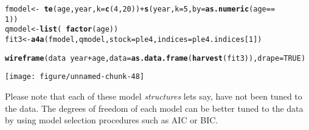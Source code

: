 \documentclass[a4paper,english,10pt]{article}\usepackage[]{graphicx}\usepackage[]{color}
\makeatletter
\def\maxwidth{ %
  \ifdim\Gin@nat@width>\linewidth
    \linewidth
  \else
    \Gin@nat@width
  \fi
}
\newcommand{\hlnum}[1]{\textcolor[rgb]{0.686,0.059,0.569}{#1}}%
\newcommand{\hlopt}[1]{\textcolor[rgb]{0,0,0}{#1}}%
\newcommand{\hlstd}[1]{\textcolor[rgb]{0.345,0.345,0.345}{#1}}%
\newcommand{\hlkwb}[1]{\textcolor[rgb]{0.69,0.353,0.396}{#1}}%
\newcommand{\hlkwc}[1]{\textcolor[rgb]{0.333,0.667,0.333}{#1}}%
\newcommand{\hlkwd}[1]{\textcolor[rgb]{0.737,0.353,0.396}{\textbf{#1}}}%
\newenvironment{kframe}{%
 \def\at@end@of@kframe{}%
 \ifinner\ifhmode%
  \def\at@end@of@kframe{\end{minipage}}%
  \begin{minipage}{\columnwidth}%
 \fi\fi%
 \def\FrameCommand##1{\hskip\@totalleftmargin \hskip-\fboxsep
 \colorbox{shadecolor}{##1}\hskip-\fboxsep
     \hskip-\linewidth \hskip-\@totalleftmargin \hskip\columnwidth}%
 \MakeFramed {\advance\hsize-\width
   \@totalleftmargin\z@ \linewidth\hsize
   \@setminipage}}%
 {\par\unskip\endMakeFramed%
 \at@end@of@kframe}
\newenvironment{knitrout}{}{} %
\makeatother
\begin{document}
\begin{knitrout}
\color{fgcolor}\begin{kframe}
\begin{alltt}
\hlstd{fmodel} \hlkwb{<-} \hlopt{~}\hlkwd{te}\hlstd{(age, year,} \hlkwc{k} \hlstd{=} \hlkwd{c}\hlstd{(}\hlnum{4}\hlstd{,} \hlnum{20}\hlstd{))} \hlopt{+} \hlkwd{s}\hlstd{(year,} \hlkwc{k} \hlstd{=} \hlnum{5}\hlstd{,} \hlkwc{by} \hlstd{=} \hlkwd{as.numeric}\hlstd{(age} \hlopt{==}
    \hlnum{1}\hlstd{))}
\hlstd{qmodel} \hlkwb{<-} \hlkwd{list}\hlstd{(}\hlopt{~}\hlkwd{factor}\hlstd{(age))}
\hlstd{fit3} \hlkwb{<-} \hlkwd{a4a}\hlstd{(fmodel, qmodel,} \hlkwc{stock} \hlstd{= ple4,} \hlkwc{indices} \hlstd{= ple4.indices[}\hlnum{1}\hlstd{])}
\end{alltt}


{\ttfamily\noindent\itshape\color{messagecolor}{\#\# Note: The following observations are treated as being missing at random:\\\#\# 	\ \ \ \ fleet year age\\\#\# 	 BTS-Isis 1997\ \  1\\\#\# 	 BTS-Isis 1997\ \  2\\\#\#\ \ \ \ \ \  Predictions will be made for missing observations.}}\begin{alltt}
\hlkwd{wireframe}\hlstd{(data} \hlopt{~} \hlstd{year} \hlopt{+} \hlstd{age,} \hlkwc{data} \hlstd{=} \hlkwd{as.data.frame}\hlstd{(}\hlkwd{harvest}\hlstd{(fit3)),} \hlkwc{drape} \hlstd{=} \hlnum{TRUE}\hlstd{)}
\end{alltt}
\end{kframe}
\texttt{[image: figure/unnamed-chunk-48]} 

\end{knitrout}


Please note that each of these model \emph{structures} lets say, have not been tuned to the data.  The degrees of freedom of each model can be better tuned to the data by using model selection procedures such as AIC or BIC.
\end{document}
